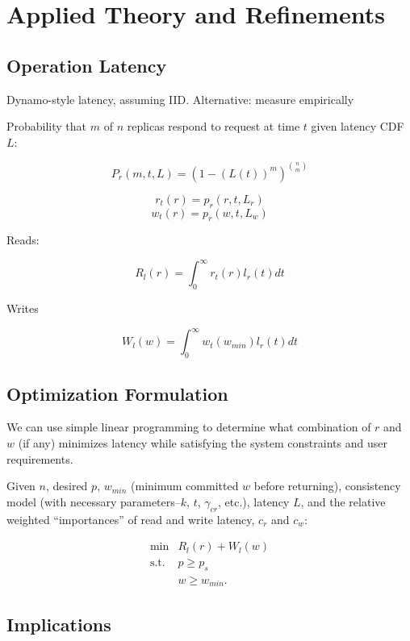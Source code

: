 \documentclass{vldb}
\begin{document}
\section{Applied Theory and Refinements}
\label{sec:optimize}

\subsection{Operation Latency}

\label{sec:dynamo-prop}

Dynamo-style latency, assuming IID.  Alternative: measure empirically

Probability that $m$ of $n$ replicas respond to request at time $t$ given latency CDF $L$:

$$P_r(m, t, L) = (1-(L(t))^m)^{n \choose m}$$

$$r_t(r) = p_r(r, t, L_r)$$
$$w_t(r) = p_r(w, t, L_w)$$

Reads:

$$R_l(r) = \int_0^{\infty} r_t(r) l_r(t) dt$$

Writes

$$W_l(w) = \int_0^{\infty} w_t(w_{min}) l_r(t) dt$$



\subsection{Optimization Formulation}

We can use simple linear programming to determine what combination of
$r$ and $w$ (if any) minimizes latency while satisfying the system
constraints and user requirements.

Given $n$, desired $p$, $w_{min}$ (minimum committed $w$ before
returning), consistency model (with necessary parameters--$k$, $t$,
$\gamma_{cr}$, etc.), latency $L$, and the relative weighted
``importances'' of read and write latency, $c_r$ and $c_w$:

\begin{equation}
 \begin{array}{rl}
    \min        & R_l(r) +W_l(w) \\
    \mbox{s.t.} & p \ge p_s \\
                & w \ge w_{min}.
    \end{array}
\end{equation}

\subsection{Implications}
\label{sec:discussion}
\end{document}
